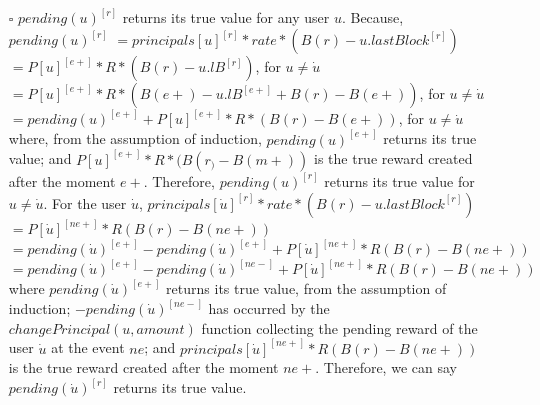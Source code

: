 \documentclass{article}
\begin{document}
\begin{itemize}
\begin{itemize}
    \item[$\square$] { $ pending(u)^{[r]}$ returns its true value for any user $u$.}
    \newline \newline
    Because, $ pending(u)^{[r]}$
    \newline \newline
    $ = principals[u]^{[r]} * rate * (B(r)-u.lastBlock^{[r]}) $
    \newline \newline
    $ = P[u]^{[e+]} * R * (B(r)-u.lB^{[r]}) $, for $u \neq \dot u$
    \newline \newline
    $ = P[u]^{[e+]} * R * (B(e+)-u.lB^{[e+]}+B(r)-B(e+))$, for $u \neq \dot u$
    \newline \newline
    $ = pending(u)^{[e+]} + P[u]^{[e+]} * R * (B(r)-B(e+))$, for $u \neq \dot u$
    \newline \newline
    where, from the assumption of induction, $pending(u)^{[e+]}$ returns 
    its true value; 
    and $P[u]^{[e+]} * R * (B(r_)-B(m+))$ is the true reward created 
    after the moment $e+$. Therefore, 
    $ pending(u)^{[r]}$ returns its true value for $u \neq \dot u$.
    \newline \newline
    For the user $\dot u$,
    \newline \newline
    $ principals[\dot u]^{[r]} * rate * (B(r)-u.lastBlock^{[r]}) $
    \newline \newline
    $ = P[\dot u]^{[ne+]} * R (B(r)-B(ne+)) $
    \newline \newline
    $ = pending(\dot u)^{[e+]} - pending(\dot u)^{[e+]} + P[\dot u]^{[ne+]} * R (B(r)-B(ne+)) $
    \newline \newline
    $ = pending(\dot u)^{[e+]} - pending(\dot u)^{[ne-]} + P[\dot u]^{[ne+]} * R (B(r)-B(ne+)) $
    \newline \newline
    where $pending(\dot u)^{[e+]}$ returns its true value, from the assumption of induction;
    $- pending(\dot u)^{[ne-]} $ has occurred by the $changePrincipal(u, amount)$ 
    function collecting the pending reward of the user $\dot u$ at the event $ne$;
    and $principals[\dot u]^{[ne+]} * R (B(r)-B(ne+))$ is 
    the true reward created after the moment $ne+$.
    Therefore, we can say $ pending(\dot u)^{[r]}$ returns its true value.


\end{itemize}
\end{itemize}
\end{document}
